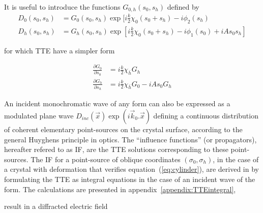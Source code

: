 \documentclass[preprint]{iucr}              %
\newcommand{\inblue}[1]{{\color{blue}#1}}
\newcommand{\inred}[1]{{\color{red}#1}}
\begin{document}
\inblue{It is \inred{useful} to introduce the functions $G_{0,h}(s_0,s_h)$ defined by
  \begin{subequations}
    \begin{align}
      D_0(s_0,s_h) &= G_0(s_0,s_h) \exp[i\frac{k}{2}\chi_0 (s_0+s_h)-i \phi_2(s_h)\\
      D_h(s_0,s_h) &= G_h(s_0,s_h) \exp[i\frac{k}{2}\chi_0 (s_0+s_h)-i \phi_1(s_0)+iAs_0s_h]
    \end{align}
  \end{subequations}

for which TTE have a simpler form

  \begin{subequations}
    \begin{align}
      \frac{\partial G_0}{\partial s_0} &= i \frac{k}{2}\chi_{\bar{h}} G_h
      \\
      \frac{\partial G_h}{\partial s_h} &= i \frac{k}{2}\chi_{\bar{h}} G_0 - i A s_0 G_h
    \end{align}
  \end{subequations}

An incident monochromatic wave of any form can also be expressed as a modulated plane wave $D_{inc}(\vec x)\exp(i \vec k_0 . \vec x)$ defining a continuous distribution of coherent elementary point-sources on the crystal surface, according to the general Huyghens principle in optics. The “influence functions” (or propagators), hereafter refered to as IF, are the TTE solutions corresponding to these point-sources. The IF for a point-source of  oblique coordinates $(\sigma_0,\sigma_h)$, in the case of  a crystal with deformation that verifies equation~(\ref{eq:cylinder}), are derived in \cite{GuigayFerrero2016} by formulating the TTE  as integral equations in the case of an incident wave of the form. The calculations are presented in appendix~\ref{appendix:TTEintegral},} \inred{result in a diffracted electric field}
\end{document}
